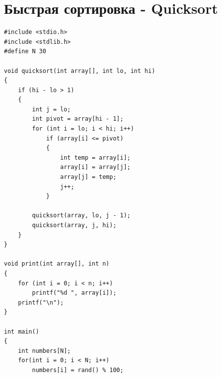 \documentclass{article}
\begin{document}
\section*{Быстрая сортировка - Quicksort}
\begin{multicols}{2}
\begin{lstlisting}
#include <stdio.h>
#include <stdlib.h>
#define N 30

void quicksort(int array[], int lo, int hi)
{
    if (hi - lo > 1)
    {
        int j = lo;
        int pivot = array[hi - 1];
        for (int i = lo; i < hi; i++)
            if (array[i] <= pivot)
            {
                int temp = array[i];
                array[i] = array[j];
                array[j] = temp;
                j++;
            }

        quicksort(array, lo, j - 1);
        quicksort(array, j, hi);
    }
}

void print(int array[], int n)
{
    for (int i = 0; i < n; i++)
        printf("%d ", array[i]);
    printf("\n");
}

int main()
{
    int numbers[N];
    for(int i = 0; i < N; i++)
        numbers[i] = rand() % 100;
    

\end{lstlisting}
\end{multicols}
\end{document}
